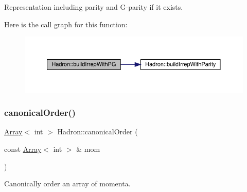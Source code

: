 Representation including parity and G-\/parity if it exists. 

Here is the call graph for this function\+:\nopagebreak
\begin{figure}[H]
\begin{center}
\leavevmode
\includegraphics[width=350pt]{d1/daf/namespaceHadron_a45b2852ba4456b8729474ced77a3615f_cgraph}
\end{center}
\end{figure}
\mbox{\label{namespaceHadron_a12bd76a337723c31527ee95d46f170d1}} 
\subsubsection{\texorpdfstring{canonicalOrder()}{canonicalOrder()}}
{\footnotesize\ttfamily \mbox{\hyperlink{classXMLArray_1_1Array}{Array}}$<$ int $>$ Hadron\+::canonical\+Order (\begin{DoxyParamCaption}\item[{const \mbox{\hyperlink{classXMLArray_1_1Array}{Array}}$<$ int $>$ \&}]{mom }\end{DoxyParamCaption})}



Canonically order an array of momenta. 

